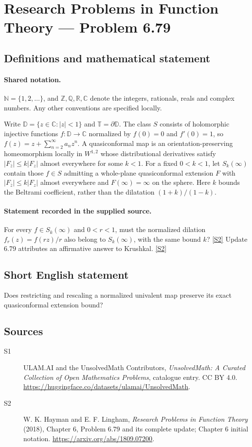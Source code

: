 \documentclass[11pt]{article}
\newcommand{\sref}[2]{\hyperlink{source:#1:#2}{[S#2]}}
\begin{document}
\section{Research Problems in Function Theory — Problem 6.79}\label{statement}

\subsection{Definitions and mathematical statement}

\paragraph{Shared notation.}$\mathbb N=\{1,2,\ldots\}$, and $\mathbb Z,\mathbb Q,\mathbb R,\mathbb C$ denote the integers, rationals, reals and complex numbers. Any other conventions are specified locally.


Write $\mathbb D=\{z\in\mathbb C:|z|<1\}$ and $\mathbb T=\partial\mathbb D$. The class $S$ consists of holomorphic injective functions $f:\mathbb D\to\mathbb C$ normalized by $f(0)=0$ and $f'(0)=1$, so $f(z)=z+\sum_{n=2}^{\infty}a_nz^n$. A quasiconformal map is an orientation-preserving homeomorphism locally in $W^{1,2}$ whose distributional derivatives satisfy $|F_{\bar z}|\le k|F_z|$ almost everywhere for some $k<1$. For a fixed $0<k<1$, let $S_k(\infty)$ contain those $f\in S$ admitting a whole-plane quasiconformal extension $F$ with $|F_{\bar z}|\le k|F_z|$ almost everywhere and $F(\infty)=\infty$ on the sphere. Here $k$ bounds the Beltrami coefficient, rather than the dilatation $(1+k)/(1-k)$.
\paragraph{Statement recorded in the supplied source.}
For every $f\in S_k(\infty)$ and $0<r<1$, must the normalized dilation $f_r(z)=f(rz)/r$ also belong to $S_k(\infty)$, with the same bound $k$? \sref{statement}{2}
Update 6.79 attributes an affirmative answer to Krushkal. \sref{statement}{2}
\subsection{Short English statement}
Does restricting and rescaling a normalized univalent map preserve its exact quasiconformal extension bound?
\subsection{Sources}
\begin{description}
\item[\hypertarget{source:statement:1}{S1}] ULAM.AI and the UnsolvedMath Contributors, \emph{UnsolvedMath: A Curated Collection of Open Mathematics Problems}, catalogue entry. CC BY 4.0. \url{https://huggingface.co/datasets/ulamai/UnsolvedMath}.
\item[\hypertarget{source:statement:2}{S2}] W. K. Hayman and E. F. Lingham, \emph{Research Problems in Function Theory} (2018), Chapter 6, Problem 6.79 and its complete update; Chapter 6 initial notation. \url{https://arxiv.org/abs/1809.07200}.
\end{description}
\label{end:statement}
\end{document}
